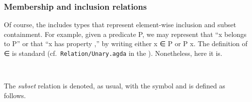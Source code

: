 \subsubsection{Membership and inclusion relations}\label{membership-and-inclusion-relations}

Of course, the \ualib includes types that represent element-wise inclusion and subset containment. For example, given a predicate \af P, we may represent that  ``\ab x belongs to \af P'' or that ``\ab x has property ,'' by writing either \ab x \af ∈ \af P or \af P \ab x.  The definition of \af ∈ is standard (cf.~\texttt{Relation/Unary.agda} in the \agdastdlib). Nonetheless, here it is.
\ccpad
\begin{code}%
\>[1]\AgdaSpace{}%
\AgdaSymbol{:}\AgdaSpace{}%
\AgdaSymbol{\{}\AgdaSpace{}%
\AgdaSymbol{:}\AgdaSpace{}%
%
\AgdaSpace{}%
\AgdaSymbol{\}}\AgdaSpace{}%
\AgdaSpace{}%
\AgdaSpace{}%
\AgdaSpace{}%
\AgdaSpace{}%
\AgdaSpace{}%
\AgdaSpace{}%
\AgdaSpace{}%
%
\<%
\\
%
\>[1]\AgdaSpace{}%
\AgdaSpace{}%
\AgdaSpace{}%
\AgdaSymbol{=}\AgdaSpace{}%
\AgdaSpace{}%
\<%
\end{code}
\ccpad
The \textit{subset} relation is denoted, as usual, with the  symbol and is defined as follows.
\ccpad
\begin{code}%
\>[0]\AgdaSpace{}%
\AgdaSymbol{:}\AgdaSpace{}%
\AgdaSymbol{\{}\AgdaSpace{}%
\AgdaSymbol{:}\AgdaSpace{}%
%
\AgdaSpace{}%
\AgdaSymbol{\}}\AgdaSpace{}%
\AgdaSpace{}%
\AgdaSpace{}%
\AgdaSpace{}%
\AgdaSpace{}%
\AgdaSpace{}%
\AgdaSpace{}%
\AgdaSpace{}%
\AgdaSpace{}%
\AgdaSpace{}%
\AgdaSpace{}%
\AgdaSpace{}%
\AgdaSpace{}%
\AgdaSpace{}%
%
\<%
\\
\>[0]\AgdaSpace{}%
\AgdaSpace{}%
\AgdaSpace{}%
\AgdaSymbol{=}\AgdaSpace{}%
\AgdaSpace{}%
\AgdaSymbol{\{}\AgdaSymbol{\}}\AgdaSpace{}%
\AgdaSpace{}%
\AgdaSpace{}%
\AgdaSpace{}%
\AgdaSpace{}%
\AgdaSpace{}%
\AgdaSpace{}%
\AgdaSpace{}%
\<%
\end{code}

